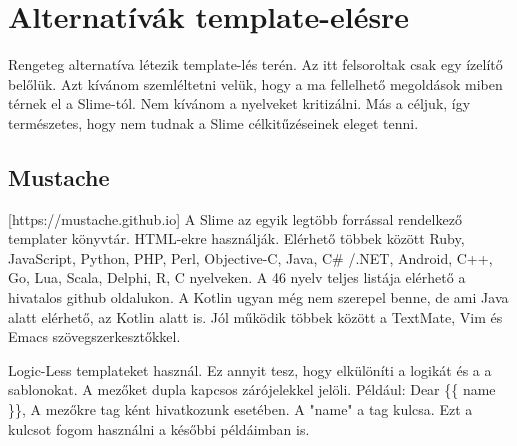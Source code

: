 \section{Alternatívák template-elésre }
Rengeteg alternatíva létezik template-lés terén.
Az itt felsoroltak csak egy ízelítő belőlük.
Azt kívánom szemléltetni velük, hogy a ma fellelhető megoldások miben térnek el a Slime-tól.
Nem kívánom a nyelveket kritizálni.
Más a céljuk, így természetes, hogy nem tudnak a Slime célkitűzéseinek eleget tenni.

\subsection{Mustache}
[https://mustache.github.io]
A Slime az egyik legtöbb forrással rendelkező templater könyvtár.
HTML-ekre használják.
Elérhető többek között Ruby, JavaScript, Python, PHP, Perl, Objective-C, Java, C\# /.NET, Android, C++, Go, Lua, Scala, Delphi, R, C nyelveken.
A 46 nyelv teljes listája elérhető a hivatalos github oldalukon.
A Kotlin ugyan még nem szerepel benne, de ami Java alatt elérhető, az Kotlin alatt is.
Jól működik többek között a TextMate, Vim és Emacs szövegszerkesztőkkel.

Logic-Less templateket használ.
Ez annyit tesz, hogy elkülöníti a logikát és a a sablonokat.
A mezőket dupla kapcsos zárójelekkel jelöli.
Például: Dear \{\{ name \}\},
A mezőkre tag ként hivatkozunk esetében.
A "name" a tag kulcsa.
Ezt a kulcsot fogom használni a későbbi példáimban is.

